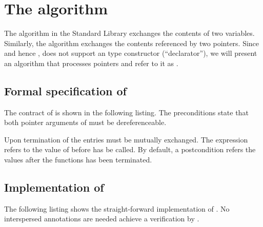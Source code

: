 
\section{The \swap algorithm}

The \swap algorithm \cite[\S 28.6.3]{cxx-17-draft}
in the \cxx Standard Library exchanges the contents of
two variables.
Similarly, the \iterswap algorithm \cite[\S 28.6.3]{cxx-17-draft}
exchanges the contents referenced by two pointers.  
Since \isoc and hence \acsl, does not support an \inl{&} type constructor (``declarator''),
we will present an algorithm that processes pointers
and refer to it as \swap.


\subsection{Formal specification of \swap}

The contract of  is shown in the following listing.
The preconditions state that both pointer arguments of \swap must be dereferenceable.



Upon termination of \swap the entries must be mutually exchanged.
The expression  refers to the value of 
before \swap has be called.
By default, a postcondition refers the values after the functions has been terminated.

\subsection{Implementation of \swap}

The following listing shows the straight-forward implementation of .
No interspersed \acsl annotations are needed achieve a verification by \wpframac.



\clearpage

